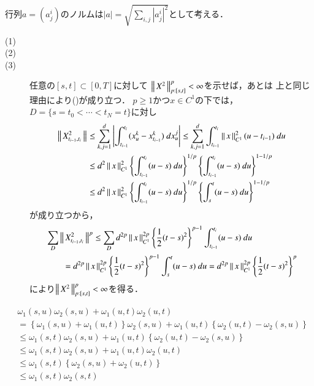 	行列$a = (a_j^i)$のノルムは$|a| = \sqrt{\sum_{i,j}|a_j^i|^2}$として考える．
	
	\begin{thm}\mbox{}
		\begin{description}
			\item[(1)]
			\item[(2)] 
				
			\item[(3)] 任意の$[s,t] \subset [0,T]$に対して
				$\left\|\, X^2\, \right\|_{p:[s,t]}^p < \infty$を示せば，あとは
				上と同じ理由により()が成り立つ．
				$p \geq 1$かつ$x \in C^1$の下では，$D = \{s=t_0 < \cdots < t_N = t\}$に対し
				\begin{align}
					\left\|\, X^2_{t_{i-1},t_i}\, \right\|_{}
					&\leq \sum_{k,j=1}^d \left| \int_{t_{i-1}}^{t_i} (x^k_u - x^k_{t_{i-1}})\ dx^j_u \right|
					\leq \sum_{k,j=1}^d \int_{t_{i-1}}^{t_i} \left\|\, x\, \right\|_{C^1}^2(u-t_{i-1})\ du \\
					&\leq d^2 \left\|\, x\, \right\|_{C^1}^2 \left\{ \int_{t_{i-1}}^{t_i} (u-s)\ du \right\}^{1/p}
						\left\{ \int_{t_{i-1}}^{t_i} (u-s)\ du \right\}^{1-1/p} \\
					&\leq d^2 \left\|\, x\, \right\|_{C^1}^2 \left\{ \int_{t_{i-1}}^{t_i} (u-s)\ du \right\}^{1/p}
						\left\{ \int_s^t (u-s)\ du \right\}^{1-1/p}
				\end{align}
				が成り立つから，
				\begin{align}
					&\sum_D \left\|\, X^2_{t_{i-1},t_i}\, \right\|_{}^p
					\leq \sum_D d^{2p}\left\|\, x\, \right\|_{C^1}^{2p} \left\{ \frac{1}{2}(t-s)^2 \right\}^{p-1}
						\int_{t_{i-1}}^{t_i} (u-s)\ du \\
					&\qquad= d^{2p}\left\|\, x\, \right\|_{C^1}^{2p} \left\{ \frac{1}{2}(t-s)^2 \right\}^{p-1}
						\int_s^t (u-s)\ du
					= d^{2p}\left\|\, x\, \right\|_{C^1}^{2p} \left\{ \frac{1}{2}(t-s)^2 \right\}^p
				\end{align}
				により$\left\|\, X^2\, \right\|_{p:[s,t]}^p < \infty$を得る．
				\QED
		\end{description}
	\end{thm}
	
	\begin{prf}
		\begin{align}
			&\omega_1(s,u)\omega_2(s,u) + \omega_1(u,t)\omega_2(u,t) \\
			&= \left\{ \omega_1(s,u) + \omega_1(u,t) \right\}\omega_2(s,u) + \omega_1(u,t)\left\{\omega_2(u,t) - \omega_2(s,u)\right\} \\
			&\leq \omega_1(s,t)\omega_2(s,u) + \omega_1(u,t)\left\{\omega_2(u,t) - \omega_2(s,u)\right\} \\
			&\leq \omega_1(s,t)\omega_2(s,u) + \omega_1(u,t)\omega_2(u,t) \\
			&\leq \omega_1(s,t)\left\{ \omega_2(s,u) + \omega_2(u,t)\right\} \\
			&\leq \omega_1(s,t)\omega_2(s,t)
		\end{align}
	\end{prf}
	

